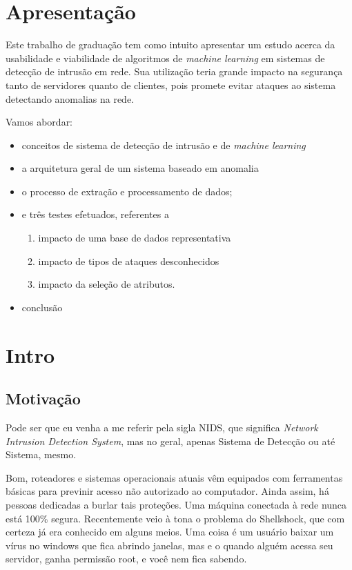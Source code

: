 \documentclass[12pt,a4paper]{article}
\begin{document}
\section{Apresentação}
    Este trabalho de graduação tem como intuito apresentar um estudo acerca da usabilidade e viabilidade de
    algoritmos de \textit{machine learning} em sistemas de detecção de intrusão em rede.
    Sua utilização teria grande impacto na segurança tanto de servidores quanto de clientes,
    pois promete evitar ataques ao sistema detectando anomalias na rede.

    Vamos abordar:
    \begin{itemize}
        \item conceitos de sistema de detecção de intrusão e de \textit{machine learning}
        \item a arquitetura geral de um sistema baseado em anomalia
        \item o processo de extração e processamento de dados;
        \item e três testes efetuados, referentes a
        \begin{enumerate}
            \item impacto de uma base de dados representativa
            \item impacto de tipos de ataques desconhecidos
            \item impacto da seleção de atributos.
        \end{enumerate}
        \item conclusão
    \end{itemize}


\section{Intro}
    \subsection{Motivação}
    Pode ser que eu venha a me referir pela sigla NIDS, que significa \textit{Network Intrusion Detection System},
    mas no geral, apenas Sistema de Detecção ou até Sistema, mesmo. \par
    Bom, roteadores e sistemas operacionais atuais vêm equipados com ferramentas básicas para previnir acesso não autorizado
    ao computador. Ainda assim, há pessoas dedicadas a burlar tais proteções. Uma máquina conectada à rede nunca está 100\% segura.
    Recentemente veio à tona o problema do Shellshock, que com certeza já era conhecido em alguns meios.
    Uma coisa é um usuário baixar um vírus no windows que fica abrindo janelas, mas e o quando alguém acessa seu servidor,
    ganha permissão root, e você nem fica sabendo. \par
\end{document}
